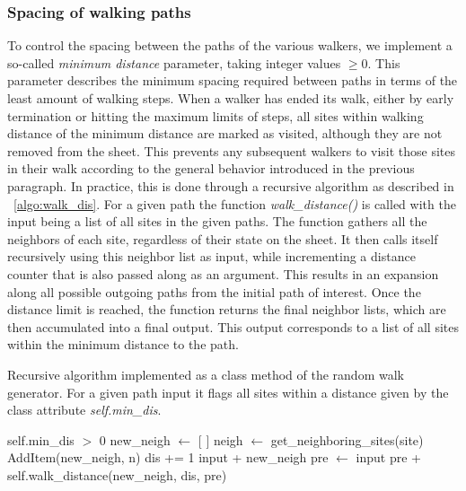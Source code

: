 \subsubsection{Spacing of walking paths} %
To control the spacing between the paths of the various walkers, we implement a so-called \textit{minimum distance} parameter, taking integer values $\ge 0$. This parameter describes the minimum spacing required between paths in terms of the least amount of walking steps. When a walker has ended its walk, either by early termination or hitting
the maximum limits of steps, all sites within walking distance of the minimum
distance are marked as visited, although they are not removed from the sheet.
This prevents any subsequent walkers to visit those sites in their walk
according to the general behavior introduced in the previous paragraph. In
practice, this is done through a recursive algorithm as described in ~\cref{algo:walk_dis}. For a given path the function \textit{walk\_distance()} is called with the input being a list of all sites in the given paths. The function gathers all the neighbors of each site, regardless of their state on the sheet. It then calls itself recursively using this neighbor list as input, while incrementing a distance counter that is also passed along as an argument. This results in an expansion along all possible outgoing paths from the initial path of interest. Once the distance limit is reached, the function returns the final neighbor lists, which are then accumulated into a final output. This output corresponds to a list of all sites within the minimum distance to the path.


\begin{algorithm}[!htb]
  \caption{Recursive algorithm implemented as a class method of the random walk generator. For a given path input it flags all sites within a distance given by the class attribute \textit{self.min\_dis}.}
  \label{algo:walk_dis}
  \begin{algorithmic}[1]
    \Require self.min\_dis $>$ 0 
      \State new\_neigh $\gets$ [ ] 
        \State neigh $\gets$ get\_neighboring\_sites(site) 
           
            \State AddItem(new\_neigh, n) 
          \EndIf
        \EndFor
      \EndFor
      \State dis += 1 
       
        \State \Return input + new\_neigh 
      \Else {}
        \State pre $\gets$ input
        \State \Return pre +  self.walk\_distance(new\_neigh, dis, pre)
      \EndIf
    \EndFunction
  \end{algorithmic}
\end{algorithm}


